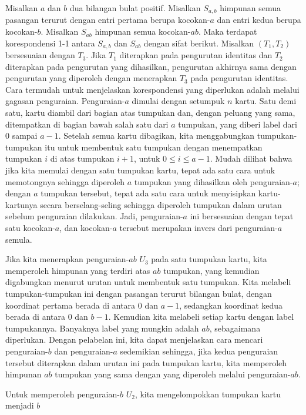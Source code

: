 \begin{theorem}\label{thm 3.3.1} Misalkan $a$ dan $b$ dua bilangan bulat positif.
Misalkan $S_{a,b}$ himpunan semua pasangan terurut dengan entri pertama berupa
kocokan-$a$ dan entri kedua berupa kocokan-$b$.  Misalkan $S_{ab}$ himpunan semua
kocokan-$ab$.  Maka terdapat korespondensi 1-1 antara $S_{a,b}$ dan $S_{ab}$ dengan sifat
berikut.  Misalkan $(T_1, T_2)$ bersesuaian dengan $T_3$.  Jika $T_1$ diterapkan pada
pengurutan identitas dan $T_2$ diterapkan pada pengurutan yang dihasilkan, pengurutan
akhirnya sama dengan pengurutan yang diperoleh dengan menerapkan $T_3$ pada pengurutan
identitas.
\proof Cara termudah untuk menjelaskan korespondensi yang diperlukan adalah melalui
gagasan penguraian.  Penguraian-$a$ dimulai dengan setumpuk $n$ kartu.
Satu demi satu, kartu diambil dari bagian atas tumpukan dan, dengan peluang yang sama,
ditempatkan di bagian bawah salah satu dari $a$ tumpukan, yang diberi label dari 0 sampai
$a-1$.  Setelah semua kartu dibagikan, kita menggabungkan tumpukan-tumpukan itu untuk
membentuk satu tumpukan dengan menempatkan tumpukan $i$ di atas tumpukan $i+1$, untuk
$0 \le i \le a-1$.  Mudah dilihat bahwa jika kita memulai dengan satu tumpukan kartu,
tepat ada satu cara untuk memotongnya sehingga diperoleh $a$ tumpukan yang dihasilkan
oleh penguraian-$a$; dengan $a$ tumpukan tersebut, tepat ada satu cara untuk menyisipkan
kartu-kartunya secara berselang-seling sehingga diperoleh tumpukan dalam urutan sebelum
penguraian dilakukan.  Jadi, penguraian-$a$ ini bersesuaian dengan tepat satu kocokan-$a$,
dan kocokan-$a$ tersebut merupakan invers dari penguraian-$a$ semula.
\par 
Jika kita menerapkan penguraian-$ab$ $U_3$ pada satu tumpukan kartu, kita memperoleh
himpunan yang terdiri atas $ab$ tumpukan, yang kemudian digabungkan menurut urutan untuk
membentuk satu tumpukan.  Kita melabeli tumpukan-tumpukan ini dengan pasangan terurut
bilangan bulat, dengan koordinat pertama berada di antara 0 dan $a-1$, sedangkan koordinat
kedua berada di antara 0 dan $b-1$.  Kemudian kita melabeli setiap kartu dengan label
tumpukannya.  Banyaknya label yang mungkin adalah $ab$, sebagaimana diperlukan.  Dengan
pelabelan ini, kita dapat menjelaskan cara mencari penguraian-$b$ dan penguraian-$a$
sedemikian sehingga, jika kedua penguraian tersebut diterapkan dalam urutan ini pada
tumpukan kartu, kita memperoleh himpunan $ab$ tumpukan yang sama dengan yang diperoleh
melalui penguraian-$ab$.
\par 
Untuk memperoleh penguraian-$b$ $U_2$, kita mengelompokkan tumpukan kartu menjadi $b$

\end{theorem}
